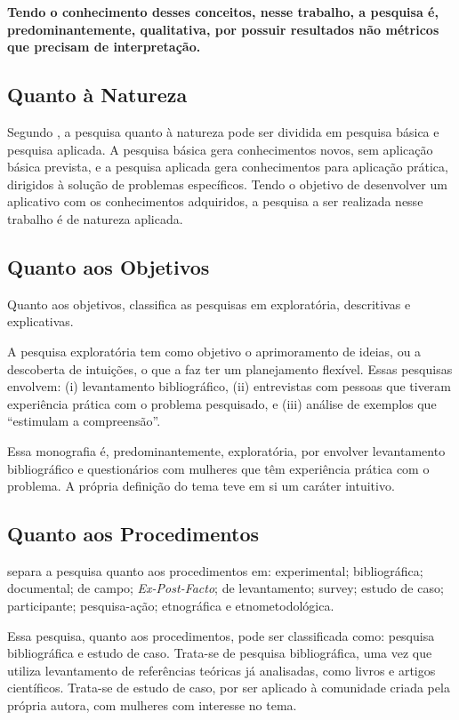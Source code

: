 \textbf{Tendo o conhecimento desses conceitos, nesse trabalho, a pesquisa é, 
predominantemente, qualitativa, por possuir resultados não métricos que precisam de 
interpretação.} 


\subsection{Quanto à Natureza}

Segundo , a pesquisa quanto à natureza pode ser dividida em pesquisa 
básica e pesquisa aplicada. A pesquisa básica gera conhecimentos novos, sem aplicação básica 
prevista, e a pesquisa aplicada gera conhecimentos para aplicação prática, dirigidos à solução de 
problemas específicos. Tendo o objetivo de desenvolver um aplicativo com os conhecimentos 
adquiridos, a pesquisa a ser realizada nesse trabalho é de natureza aplicada.

 
\subsection{Quanto aos Objetivos}

Quanto aos objetivos,  classifica as pesquisas em exploratória, 
descritivas e explicativas. 

A pesquisa exploratória tem como objetivo o aprimoramento 
de ideias, ou a descoberta de intuições, o que a faz ter um planejamento flexível. 
Essas pesquisas envolvem: (i) levantamento bibliográfico, (ii) entrevistas com pessoas 
que tiveram experiência prática com o problema pesquisado, e (iii) análise de exemplos que 
``estimulam a compreensão''.

Essa monografia é, predominantemente, exploratória, 
por envolver levantamento bibliográfico e questionários com mulheres que têm experiência 
prática com o problema. A própria definição do tema teve em si um caráter intuitivo. 

\subsection{Quanto aos Procedimentos}

 separa a pesquisa quanto aos 
procedimentos em: experimental; bibliográfica; 
documental; de campo; \emph{Ex-Post-Facto}; 
de levantamento; survey; estudo de caso; 
participante; pesquisa-ação; etnográfica e etnometodológica.

Essa pesquisa, quanto aos procedimentos, pode ser classificada como: pesquisa bibliográfica e 
estudo de caso. Trata-se de pesquisa bibliográfica, uma vez que utiliza levantamento de 
referências teóricas já analisadas, como livros e artigos científicos. Trata-se de estudo de 
caso, por ser aplicado à comunidade criada pela própria autora, com mulheres com interesse no 
tema.


